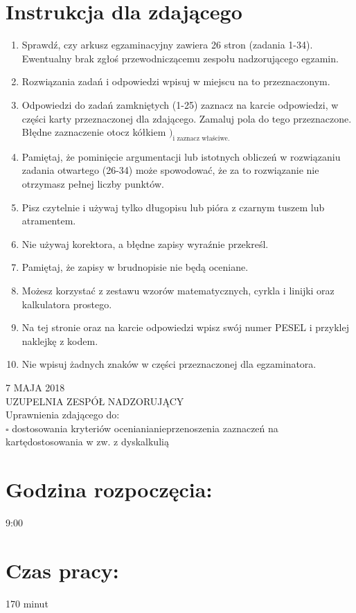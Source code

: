 \documentclass[10pt]{article}
\begin{document}
\section*{Instrukcja dla zdającego}
\begin{enumerate}
  \item Sprawdź, czy arkusz egzaminacyjny zawiera 26 stron (zadania 1-34). Ewentualny brak zgłoś przewodniczącemu zespołu nadzorującego egzamin.
  \item Rozwiązania zadań i odpowiedzi wpisuj w miejscu na to przeznaczonym.
  \item Odpowiedzi do zadań zamkniętych (1-25) zaznacz na karcie odpowiedzi, w części karty przeznaczonej dla zdającego. Zamaluj pola do tego przeznaczone. Błędne zaznaczenie otocz kółkiem \()_{\text {i zaznacz właściwe. }}\)
  \item Pamiętaj, że pominięcie argumentacji lub istotnych obliczeń w rozwiązaniu zadania otwartego (26-34) może spowodować, że za to rozwiązanie nie otrzymasz pełnej liczby punktów.
  \item Pisz czytelnie i używaj tylko długopisu lub pióra z czarnym tuszem lub atramentem.
  \item Nie używaj korektora, a błędne zapisy wyraźnie przekreśl.
  \item Pamiętaj, że zapisy w brudnopisie nie będą oceniane.
  \item Możesz korzystać z zestawu wzorów matematycznych, cyrkla i linijki oraz kalkulatora prostego.
  \item Na tej stronie oraz na karcie odpowiedzi wpisz swój numer PESEL i przyklej naklejkę z kodem.
  \item Nie wpisuj żadnych znaków w części przeznaczonej dla egzaminatora.
\end{enumerate}

7 MAJA 2018\\
UZUPELNIA ZESPÓŁ NADZORUJĄCY\\
Uprawnienia zdającego do:\\
\(\square\) dostosowania kryteriów ocenianianieprzenoszenia zaznaczeń na kartędostosowania w zw. z dyskalkulią

\section*{Godzina rozpoczęcia:}
9:00

\section*{Czas pracy:}
170 minut
\end{document}
